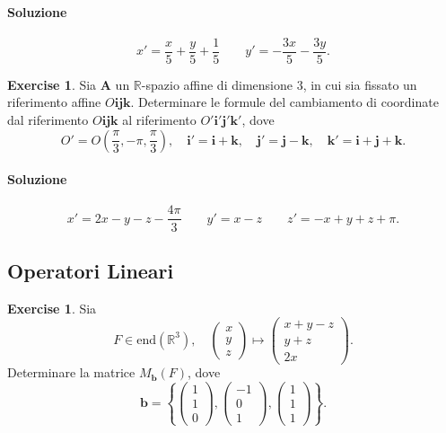 \documentclass{article}
\theoremstyle{plain}
\theoremstyle{definition}
\newtheorem{xca}[exmp]{Exercise}
\theoremstyle{remark}
\begin{document}
\paragraph{Soluzione}
\[x'=\dfrac{x}{5}+\dfrac{y}{5}+\dfrac{1}{5}\quad\quad y'=-\dfrac{3x}{5}-\dfrac{3y}{5}.\]

\vspace{10pt}

\begin{bxthm}
\begin{xca}
Sia \( \mathbf{A} \) un $\mathbb{R}$-spazio affine di dimensione $3$, in cui sia fissato un riferimento affine 
\( O\mathbf{ijk} \). Determinare le formule del cambiamento di coordinate dal riferimento \( O\mathbf{ijk} \) al 
riferimento \( O'\mathbf{i}'\mathbf{j}'\mathbf{k}' \), dove
\[
O' = O\left(\frac{\pi}{3}, -\pi, \frac{\pi}{3}\right), \quad \mathbf{i}' = \mathbf{i} + \mathbf{k}, \quad \mathbf{j}' = \mathbf{j} - \mathbf{k}, \quad \mathbf{k}' = \mathbf{i} + \mathbf{j} + \mathbf{k}.
\]
\end{xca}
\end{bxthm}
\paragraph{Soluzione}
\[x' = 2x-y-z-\dfrac{4\pi}{3}\quad\quad y' = x-z\quad\quad z' = -x+y+z+\pi.\]

\newpage
\subsection{Operatori Lineari}
\vspace{20pt}

\begin{bxthm}
\begin{xca}
    Sia 
    \[F\in\mathrm{end}(\mathbb{R}^3),\quad \begin{pmatrix}x\\y\\z\end{pmatrix}\mapsto\begin{pmatrix}x+y-z\\y+z\\2x\end{pmatrix}.\]
    Determinare la matrice $M_\mathbf{b}(F)$, dove 
    \[\mathbf{b}=\left\{\begin{pmatrix}1\\1\\0\end{pmatrix},\begin{pmatrix}-1\\0\\1\end{pmatrix},\begin{pmatrix}1\\1\\1\end{pmatrix}\right\}.\]
\end{xca}
\end{bxthm}
\end{document}
